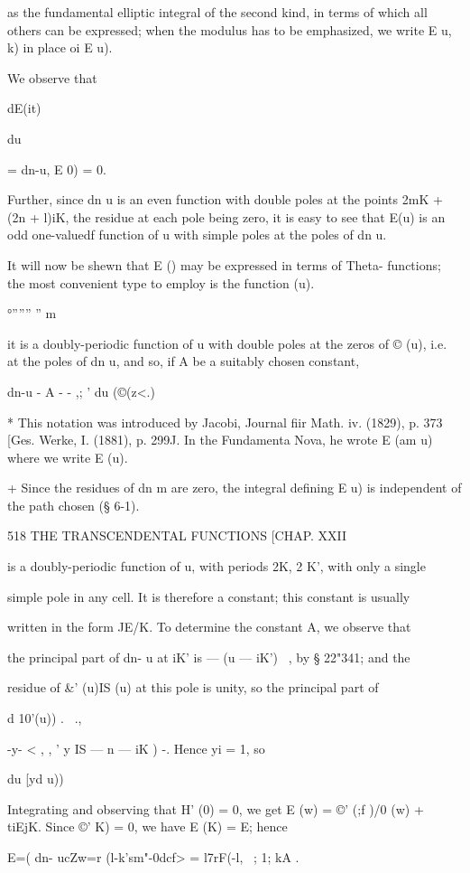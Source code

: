as the fundamental elliptic integral of the second kind, in terms of
which all others can be expressed; when the modulus has to be
emphasized, we write E u, k) in place oi E u).

We observe that

dE(it)

du

= dn-u, E 0) = 0.

Further, since dn u is an even function with double poles at the
points 2mK + (2n + l)iK, the residue at each pole being zero, it is
easy to see that E(u) is an odd one-valuedf function of u with simple
poles at the poles of dn u.

It will now be shewn that E () may be expressed in terms of Theta-
functions; the most convenient type to employ is the function (u).

 °'''''' '' m %

it is a doubly-periodic function of u with double poles at the zeros
of © (u), i.e. at the poles of dn u, and so, if A be a suitably chosen
constant,

dn-u - A - - ,; ' du (©(z<.)

* This notation was introduced by Jacobi, Journal fiir Math. iv.
(1829), p. 373 [Ges. Werke, I. (1881), p. 299J. In the Fundamenta
Nova, he wrote E (am u) where we write E (u).

+ Since the residues of dn m are zero, the integral defining E u) is
independent of the path chosen (§ 6-1).

518 THE TRANSCENDENTAL FUNCTIONS [CHAP. XXII

is a doubly-periodic function of u, with periods 2K, 2 K', with only a
single

simple pole in any cell. It is therefore a constant; this constant is
usually

written in the form JE/K. To determine the constant A, we observe that

the principal part of dn- u at iK' is — (u — iK')~ , by § 22"341; and
the

residue of \&' (u)IS (u) at this pole is unity, so the principal part
of

d 10'(u)) . \ .,

-y- < , , ' y IS — n — iK ) -. Hence yi = 1, so

du [yd u))

Integrating and observing that H' (0) = 0, we get E (w) = ©' (;f )/0
(w) + tiEjK. Since ©' K) = 0, we have E (K) = E; hence

E=( dn- ucZw=r (l-k'sm"-0dcf> = l7rF(-l, ~; 1; kA .

